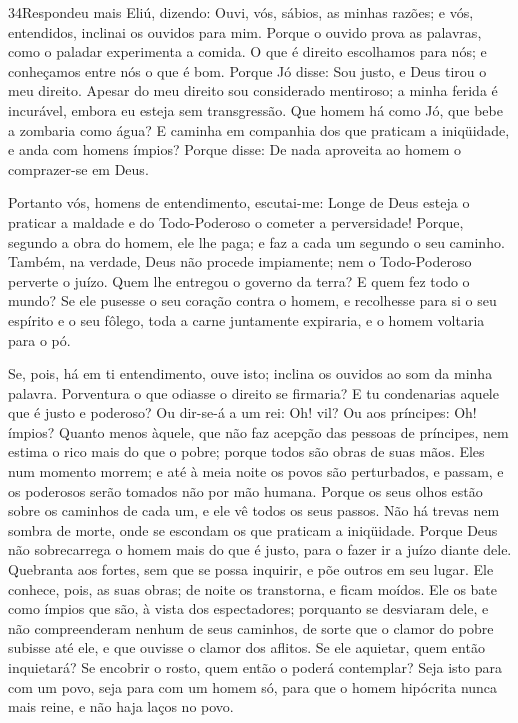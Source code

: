 \medskip

\lettrine{34} Respondeu mais Eliú, dizendo: Ouvi, vós,
sábios, as minhas razões; e vós, entendidos, inclinai os ouvidos
para mim. Porque o ouvido prova as palavras, como o paladar
experimenta a comida. O que é direito escolhamos para nós; e
conheçamos entre nós o que é bom. Porque Jó disse: Sou justo, e
Deus tirou o meu direito. Apesar do meu direito sou considerado
mentiroso; a minha ferida é incurável, embora eu esteja sem
transgressão. Que homem há como Jó, que bebe a zombaria como
água? E caminha em companhia dos que praticam a iniqüidade, e
anda com homens ímpios? Porque disse: De nada aproveita ao homem
o comprazer-se em Deus.

Portanto vós, homens de entendimento, escutai-me: Longe de Deus
esteja o praticar a maldade e do Todo-Poderoso o cometer a
perversidade! Porque, segundo a obra do homem, ele lhe paga;
e faz a cada um segundo o seu caminho. Também, na verdade,
Deus não procede impiamente; nem o Todo-Poderoso perverte o juízo.
Quem lhe entregou o governo da terra? E quem fez todo o
mundo? Se ele pusesse o seu coração contra o homem, e
recolhesse para si o seu espírito e o seu fôlego, toda a
carne juntamente expiraria, e o homem voltaria para o pó.

Se, pois, há em ti entendimento, ouve isto; inclina os ouvidos ao
som da minha palavra. Porventura o que odiasse o direito se
firmaria? E tu condenarias aquele que é justo e poderoso? Ou
dir-se-á a um rei: Oh! vil? Ou aos príncipes: Oh! ímpios?
Quanto menos àquele, que não faz acepção das pessoas de
príncipes, nem estima o rico mais do que o pobre; porque todos são
obras de suas mãos. Eles num momento morrem; e até à meia
noite os povos são perturbados, e passam, e os poderosos serão
tomados não por mão humana. Porque os seus olhos estão sobre
os caminhos de cada um, e ele vê todos os seus passos. Não há
trevas nem sombra de morte, onde se escondam os que praticam a
iniqüidade. Porque Deus não sobrecarrega o homem mais do que
é justo, para o fazer ir a juízo diante dele. Quebranta aos
fortes, sem que se possa inquirir, e põe outros em seu lugar.
Ele conhece, pois, as suas obras; de noite os transtorna, e
ficam moídos. Ele os bate como ímpios que são, à vista dos
espectadores; porquanto se desviaram dele, e não
compreenderam nenhum de seus caminhos, de sorte que o clamor
do pobre subisse até ele, e que ouvisse o clamor dos aflitos.
Se ele aquietar, quem então inquietará? Se encobrir o rosto,
quem então o poderá contemplar? Seja isto para com um povo, seja
para com um homem só, para que o homem hipócrita nunca mais
reine, e não haja laços no povo.

